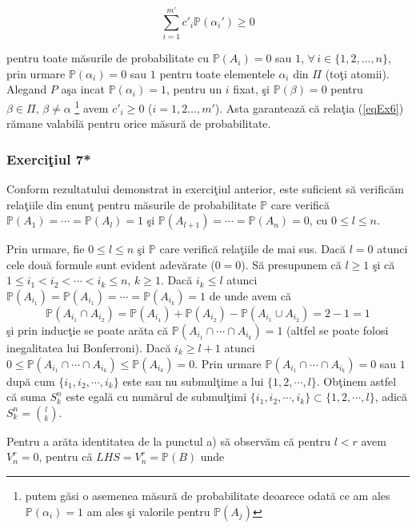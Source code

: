 \documentclass[]{article}
\def\a{{\alpha}}
\def\b{{\beta}}
\def\PP{{\mathbb P}}
\let\rmarkdownfootnote\footnote%
\def\footnote{\protect\rmarkdownfootnote}
\begin{document}
\begin{equation}\label{eqEx6}
  \sum_{i=1}^{m'}c'_{i}\PP(\a_i')\geq 0 
\end{equation}

pentru toate m\u asurile de probabilitate cu \(\PP(A_i)=0\) sau \(1\),
\(\forall\, i\in\{1,2,\dots,n\}\), prin urmare \(\PP(\a_i)=0\) sau \(1\)
pentru toate elementele \(\a_i\) din \(\Pi\) (to\c ti atomii). Alegand
\(P\) a\c sa incat \(\PP(\a_i)=1\), pentru un \(i\) fixat, \c si
\(\PP(\b)=0\) pentru \(\b\in\Pi, \, \b\neq\a\) \footnote{putem g\u asi o
  asemenea m\u asur\u a de probabilitate deoarece odat\u a ce am ales
  \(\PP(\a_i)=1\) am ales \c si valorile pentru \(\PP(A_j)\)} avem
\(c'_i\geq 0\) (\(i=1,2\dots,m'\)). Asta garanteaz\u a c\u a rela\c tia
(\ref{eqEx6}) r\u amane valabil\u a pentru orice m\u asur\u a de
probabilitate.

\subsubsection{\texorpdfstring{Exerci\c tiul
7*}{Exerciiul 7*}}\label{exerciiul-7}

Conform rezultatului demonstrat in exerci\c tiul anterior, este
suficient s\u a verific\u am rela\c tiile din enun\c t pentru
m\u asurile de probabilitate \(\PP\) care verific\u a
\(\PP(A_1)=\cdots=\PP(A_l)=1\) \c si \(\PP(A_{l+1})=\cdots=\PP(A_n)=0\),
cu \(0\leq l\leq n\).

Prin urmare, fie \(0\leq l\leq n\) \c si \(\PP\) care verific\u a
rela\c tiile de mai sus. Dac\u a \(l=0\) atunci cele dou\u a formule
sunt evident adev\u arate (\(0=0\)). S\u a presupunem c\u a \(l\geq1\)
\c si c\u a \(1\leq i_1<i_2<\cdots<i_k\leq n\), \(k\geq 1\). Dac\u a
\(i_k\leq l\) atunci \(\PP(A_{i_1})=\PP(A_{i_1})=\cdots=\PP(A_{i_k})=1\)
de unde avem c\u a \[
  \PP(A_{i_1}\cap A_{i_2})=\PP(A_{i_1})+\PP(A_{i_2})-\PP(A_{i_1}\cup A_{i_2})=2-1=1
\] \c si prin induc\c tie se poate ar\u ata c\u a
\(\PP(A_{i_1}\cap\cdots\cap A_{i_k})=1\) (altfel se poate folosi
inegalitatea lui Bonferroni). Dac\u a \(i_k\geq l+1\) atunci
\(0\leq \PP(A_{i_1}\cap\cdots\cap A_{i_k})\leq \PP(A_{i_k})=0\). Prin
urmare \(\PP(A_{i_1}\cap\cdots\cap A_{i_k})=0\) sau \(1\) dup\u a cum
\(\{i_1,i_2,\cdots,i_k\}\) este sau nu submul\c time a lui
\(\{1,2,\cdots,l\}\). Ob\c tinem astfel c\u a suma \(S_{k}^{n}\) este
egal\u a cu num\u arul de submul\c timi
\(\{i_1,i_2,\cdots,i_k\}\subset\{1,2,\cdots,l\}\), adic\u a
\(S_{k}^{n}=\binom{l}{k}\).

Pentru a ar\u ata identitatea de la punctul a) s\u a observ\u am c\u a
pentru \(l<r\) avem \(V_{n}^{r}=0\), pentru c\u a
\(LHS=V_{n}^{r}=\PP(B)\) unde
\end{document}
